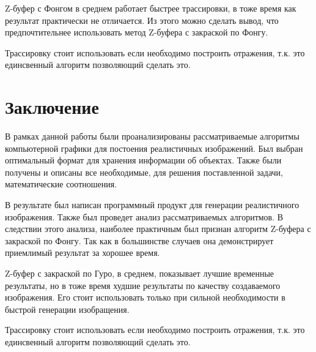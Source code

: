 \documentclass[12pt]{report}
\begin{document}
	Z-буфер с Фонгом в среднем работает быстрее трассировки, в тоже время как результат практически не отличается.
	Из этого можно сделать вывод, что предпочтительнее использовать метод Z-буфера с закраской по Фонгу.
	
	Трассировку стоит использовать если необходимо построить отражения, т.к. это единсвенный алгоритм позволяющий сделать это.
	
	\chapter*{Заключение}

	В рамках данной работы были проанализированы рассматриваемые алгоритмы компьютерной графики для постоения реалистичных изображений. Был выбран оптимальный формат для хранения информации об объектах. Также были получены и описаны все необходимые, для решения поставленной задачи, математические соотношения.
	
	В результате был написан программный продукт для генерации реалистичного изображения. Также был проведет анализ рассматриваемых алгоритмов. В следствии этого анализа, наиболее практичным был признан алгоритм Z-буфера с закраской по Фонгу. Так как в большинстве случаев она демонстрирует приемлимый результат за хорошее время.
	
	Z-буфер с закраской по Гуро, в среднем, показывает лучшие временные результаты, но в тоже время худшие результаты по качеству создаваемого изображения. Его стоит использовать только при сильной необходимости в быстрой генерации изобращения.
	
	Трассировку стоит использовать если необходимо построить отражения, т.к. это единсвенный алгоритм позволяющий сделать это.
\end{document}
